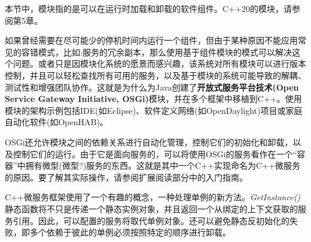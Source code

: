 \begin{tcolorbox}[colback=blue!5!white,colframe=blue!75!black, title=Note]
\hspace*{0.7cm}本节中，模块指的是可以在运行时加载和卸载的软件组件。C++20的模块，请参阅第5章。
\end{tcolorbox}

如果曾经需要在尽可能少的停机时间内运行一个组件，但由于某种原因不能应用常见的容错模式，比如:服务的冗余副本，那么使用基于组件模块的模式可以解决这个问题。或者只是因模块化系统的愿景而感兴趣，该系统对所有模块可以进行版本控制，并且可以轻松查找所有可用的服务，以及基于模块的系统可能导致的解耦、测试性和增强团队协作。这就是为什么为Java创建了\textbf{开放式服务平台技术(Open Service Gateway Initiative, OSGi)}模块，并在多个框架中移植到C++。使用模块的架构示例包括IDE(如Eclipse)、软件定义网络(如OpenDaylight)项目或家庭自动化软件(如OpenHAB)。

OSGi还允许模块之间的依赖关系进行自动化管理，控制它们的初始化和卸载，以及控制它们的运行。由于它是面向服务的，可以将使用OSGi的服务看作在一个“容器”中拥有微型(微型?)服务的东西。这就是其中一个C++实现命名为C++微服务的原因。要了解其实际操作，请参阅扩展阅读部分中的入门指南。

C++微服务框架使用了一个有趣的概念，一种处理单例的新方法。\textit{GetInstance()}静态函数将不只是传递一个静态实例对象，并且返回一个从绑定的上下文获取的服务引用。因此，可以配置的服务将取代单例对象。还可以避免静态反初始化的失败，即多个依赖于彼此的单例必须按照特定的顺序进行卸载。





